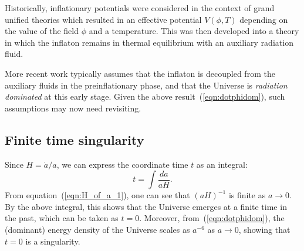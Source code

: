 Historically, inflationary potentials were considered in the context of grand unified theories \citep{PhysRevLett.48.1220,linde_1982} which resulted in an effective potential $V(\phi,T)$ depending on the value of the field $\phi$ and a temperature.  This was then developed \citep{1995PhRvL..74.1912B,PhysRevLett.75.3218} into a theory in which the inflaton remains in thermal equilibrium with an auxiliary radiation fluid.

More recent work \citep{2007PhRvD..76f3512P} typically assumes that the inflaton is decoupled from the auxiliary fluids in the preinflationary phase, and that the Universe is {\em radiation dominated\/} at this early stage. Given the above result~(\ref{eqn:dotphidom}), such assumptions may now need revisiting.



\subsection{Finite time singularity}

Since $H = \dot{a}/a$, we can express the coordinate time $t$ as an integral: 
%
\begin{equation}
  t = \int \frac{da}{aH}.
\end{equation}
%
From equation~(\ref{eqn:H_of_a_1}), one can see that $(aH)^{-1}$ is finite as $a\to0$. By the above integral, this shows that the Universe emerges at a finite time in the past, which can be taken as $t=0$.  Moreover, from~(\ref{eqn:dotphidom}), the (dominant) energy density of the Universe scales as $a^{-6}$ as $a \to 0$, showing that $t=0$ is a singularity.

